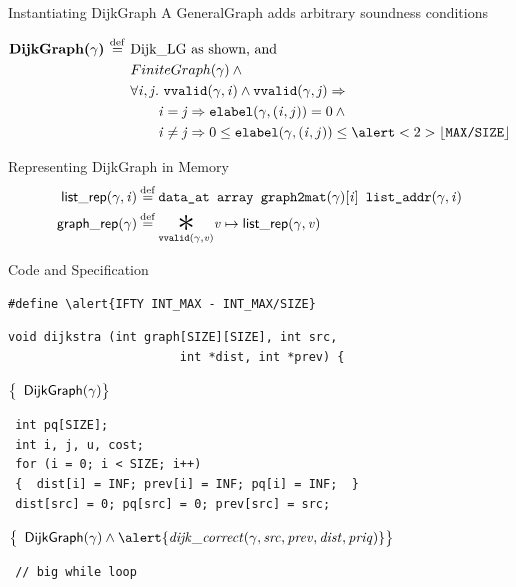 \documentclass[usenames, xcolor=dvipsnames]{beamer}
\makeatletter
\newcommand{\scon}{\mathbin{\ast}}
\renewcommand{\bigstar}{\raisebox{-0.24em}{{\scaleobj{2.5}{\scon}}}}
\newcommand{\defeq}{\mathbin{\overset{\mathrm{def}}{=}}}
\newcommand{\braces}[1]{\left\{\begin{array}{l@{}} #1 \end{array}\right\}}
\newcommand{\m}[1]{\ensuremath{\mathit{#1}}} %
\newcommand{\p}[1]{\ensuremath{\mathsf{#1}}} %
\makeatother
\begin{document}
\begin{frame}[fragile]{Instantiating DijkGraph}
A GeneralGraph adds arbitrary soundness conditions
\vspace{-1.5em}
\begin{flushleft}
\begin{equation*}
\begin{split}
\textbf{DijkGraph($\gamma$) $\defeq$ \null} &\text{Dijk\_LG as shown, and } \\
                    &FiniteGraph(\gamma) \wedge \null \\
                    &\forall \m{i,j}.~\texttt{vvalid}(\gamma, \m{i}) \wedge \texttt{vvalid}(\gamma, \m{j}) \Rightarrow \\
                    &\qquad \m{i} = \m{j} \Rightarrow \texttt{elabel}(\gamma,(\m{i},{j})) = 0 \wedge \null \\
                    &\qquad \m{i} \neq \m{j} \Rightarrow 0 \le \texttt{elabel}(\gamma,(\m{i},{j})) \le \alert<2>{\lfloor \texttt{MAX/SIZE} \rfloor}
\end{split}
\end{equation*}
\end{flushleft}
\end{frame}

\begin{frame}{Representing DijkGraph in Memory}
\begin{equation*}
\begin{split}
\p{list\_rep}(\gamma, \m{i}) &\defeq \texttt{data\_at  array  graph2mat}(\gamma)[\m{i}] \texttt{  list\_addr}(\gamma, \m{i}) \\
\vspace{1em}
\p{graph\_rep}(\gamma) &\defeq \underset{\texttt{vvalid}(\gamma,\m{v})}{\bigstar} \m{v}  \mapsto\p{list\_rep}(\gamma, \m{v})
\end{split}
\end{equation*}

\end{frame}

\begin{frame}[fragile]{Code and Specification}

\begin{Verbatim}[commandchars=\\\{\}]
#define \alert{IFTY INT_MAX - INT_MAX/SIZE}
\end{Verbatim}
\begin{Verbatim}
void dijkstra (int graph[SIZE][SIZE], int src, 
                        int *dist, int *prev) {
\end{Verbatim}
$\braces{\p{DijkGraph}(\gamma)}$
\pause
\begin{Verbatim}
 int pq[SIZE];
 int i, j, u, cost;
 for (i = 0; i < SIZE; i++)
 {  dist[i] = INF; prev[i] = INF; pq[i] = INF;  }
 dist[src] = 0; pq[src] = 0; prev[src] = src;
\end{Verbatim}
\pause
$\braces{\p{DijkGraph}(\gamma) \wedge \alert{\m{dijk\_correct}(\gamma,\m{src},\m{prev},\m{dist},\m{priq})}}$
\begin{Verbatim}
 // big while loop
\end{Verbatim}
\end{frame}
\end{document}
